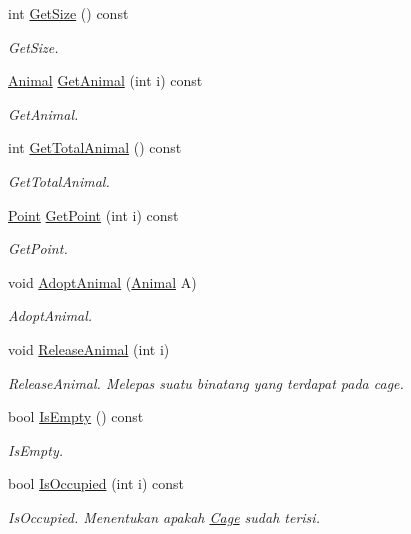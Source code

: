 \begin{DoxyCompactItemize}
int \hyperlink{classCage_abf801136c687ea862b64d0c36a2ce5cd}{Get\+Size} () const 
\begin{DoxyCompactList}\small\item\em Get\+Size. \end{DoxyCompactList}\item 
\hyperlink{classAnimal}{Animal} \hyperlink{classCage_a298833379b741edbdaf5115e4993db1e}{Get\+Animal} (int i) const 
\begin{DoxyCompactList}\small\item\em Get\+Animal. \end{DoxyCompactList}\item 
int \hyperlink{classCage_a49312121ccca0c0b731f3fe1256a28a2}{Get\+Total\+Animal} () const 
\begin{DoxyCompactList}\small\item\em Get\+Total\+Animal. \end{DoxyCompactList}\item 
\hyperlink{classPoint}{Point} \hyperlink{classCage_ae01123979c931296ca477d9d15d9efba}{Get\+Point} (int i) const 
\begin{DoxyCompactList}\small\item\em Get\+Point. \end{DoxyCompactList}\item 
void \hyperlink{classCage_a928e4a1686c1c9ca4f7e703d107de415}{Adopt\+Animal} (\hyperlink{classAnimal}{Animal} A)
\begin{DoxyCompactList}\small\item\em Adopt\+Animal. \end{DoxyCompactList}\item 
void \hyperlink{classCage_a84c0aac0bfd315ef7e5d0595dea5be5a}{Release\+Animal} (int i)
\begin{DoxyCompactList}\small\item\em Release\+Animal. Melepas suatu binatang yang terdapat pada cage. \end{DoxyCompactList}\item 
bool \hyperlink{classCage_a8f2321f5ca7e5fed271350ea1800e10b}{Is\+Empty} () const 
\begin{DoxyCompactList}\small\item\em Is\+Empty. \end{DoxyCompactList}\item 
bool \hyperlink{classCage_aafb5de9009a7ef80fc039f27793c8df6}{Is\+Occupied} (int i) const 
\begin{DoxyCompactList}\small\item\em Is\+Occupied. Menentukan apakah \hyperlink{classCage}{Cage} sudah terisi. \end{DoxyCompactList}\item 

\end{DoxyCompactItemize}
